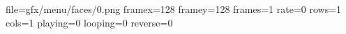 file=gfx/menu/faces/0.png
framex=128
framey=128
frames=1
rate=0
rows=1
cols=1
playing=0
looping=0
reverse=0